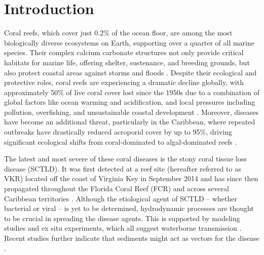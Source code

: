 \documentclass[preprint,12pt,authoryear]{elsarticle}
\begin{document}
\linenumbers

\section{Introduction}

Coral reefs, which cover just 0.2\% of the ocean floor, are among the most biologically diverse ecosystems on Earth, supporting over a quarter of all marine species. Their complex calcium carbonate structures not only provide critical habitats for marine life, offering shelter, sustenance, and breeding grounds, but also protect coastal areas against storms and floods \citep{Moberg1999, Spalding1997, Rogers2014May, Ferrario2014, Elliff2017Jun}. Despite their ecological and protective roles, coral reefs are experiencing a dramatic decline globally, with approximately 50\% of live coral cover lost since the 1950s due to a combination of global factors like ocean warming and acidification, and local pressures including pollution, overfishing, and unsustainable coastal development \citep{Eddy2021Sep}. Moreover, diseases have become an additional threat, particularly in the Caribbean, where repeated outbreaks have drastically reduced acroporid cover by up to 95\%, driving significant ecological shifts from coral-dominated to algal-dominated reefs \citep{richardson1998coral, sutherland2004disease, aronson2001white, harvell2007coral, brandt2009dynamics}.

The latest and most severe of these coral diseases is the stony coral tissue loss disease (SCTLD). It was first detected at a reef site (hereafter referred to as VKR) located off the coast of Virginia Key in September 2014 \citep{precht2016unprecedented} and has since then propagated throughout the Florida Coral Reef (FCR) and across several Caribbean territories \citep{muller2020spatial,dobbelaere2022connecting, kramer2019map, meiling2021variable, estrada2021effects,heres2021ecological}. Although the etiological agent of SCTLD -- whether bacterial or viral -- is yet to be determined, hydrodynamic processes are thought to be crucial in spreading the disease agents. This is supported by modeling studies and ex situ experiments, which all suggest waterborne transmission \citep{aeby2019pathogenesis,dobbelaere2020coupled,eaton2021measuring, meiling2021variable}. Recent studies further indicate that sediments might act as vectors for the disease \citep{rosales2020rhodobacterales, studivan2022reef}.
\end{document}
